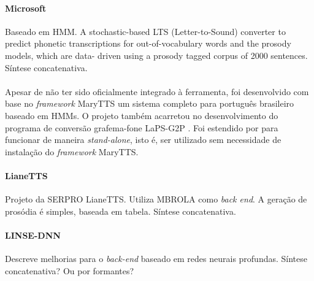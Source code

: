 \paragraph{Microsoft \cite{hmmmicrosoft}}
Baseado em HMM. A stochastic-based LTS (Letter-to-Sound) converter to predict
phonetic transcriptions for out-of-vocabulary words and the prosody models,
which are data- driven using a prosody tagged corpus of 2000 sentences. Síntese concatenativa.
\paragraph{\cite{couto}}
Apesar de não ter sido oficialmente integrado à ferramenta, foi desenvolvido com
base no \emph{framework} MaryTTS um sistema completo para português brasileiro
baseado em HMMs.
O projeto também acarretou no desenvolvimento do programa de conversão
grafema-fone LaPS-G2P \cite{g2pusp}.
Foi estendido por \cite{costa} para funcionar de maneira \emph{stand-alone},
isto é, ser utilizado sem necessidade de instalação do \emph{framework} MaryTTS.
\paragraph{LianeTTS \cite{lianetts}}
Projeto da SERPRO LianeTTS. Utiliza MBROLA como \emph{back end}. A geração de
prosódia é simples, baseada em tabela. Síntese concatenativa.
\paragraph{LINSE-DNN \cite{dnnpt}}
Descreve melhorias para o \emph{back-end} baseado em redes neurais profundas.
Síntese concatenativa? Ou por formantes?


